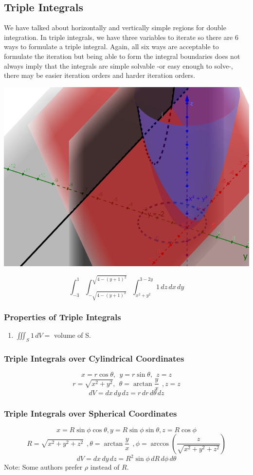 \documentclass[12pt]{article}
\begin{document}
\subsection{Triple Integrals}
We have talked about horizontally and vertically simple regions for double integration. In triple integrals, we have three variables to iterate so there are 6 ways to formulate a triple integral. Again, all six ways are acceptable to formulate the iteration but being able to form the integral boundaries does not always imply that the integrals are simple solvable -or easy enough to solve-, there may be easier iteration orders and harder iteration orders.

\includegraphics[scale=0.55]{ex1.png}

$$\int_{-3}^1 \int_{-\sqrt{4-(y+1)^2}}^{\sqrt{4-(y+1)^2}} \int_{x^2+y^2}^{3-2y} 1\,dz\,dx\,dy $$
\subsubsection{Properties of Triple Integrals}
\begin{enumerate}
\item $\displaystyle{\iiint_S 1\,dV}= $ volume of S. 
\end{enumerate}
\subsubsection{Triple Integrals over Cylindrical Coordinates}
$$x=r\cos \theta, \ \ y=r\sin \theta, \ \ z=z$$
$$r=\sqrt{x^2+y^2},\ \ \theta = \arctan \frac{y}{x}\ \ , z=z$$
$$dV=dx\,dy\,dz=r \,dr \,d\theta\, dz$$
\subsubsection{Triple Integrals over Spherical Coordinates}
$$x=R\sin\phi\cos\theta, y=R\sin\phi\sin\theta,z=R\cos\phi$$
$$R= \sqrt{x^2+y^2+z^2}\ \ , \theta = \arctan \frac{y}{x} \ \ , \phi = \arccos \left(\dfrac{z}{\sqrt{x^2+y^2+z^2}} \right)$$
$$dV=dx\,dy\,dz=R^2\sin\phi\,dR\,d\phi\,d\theta$$
Note: Some authors prefer $\rho$ instead of $R$.
\end{document}
